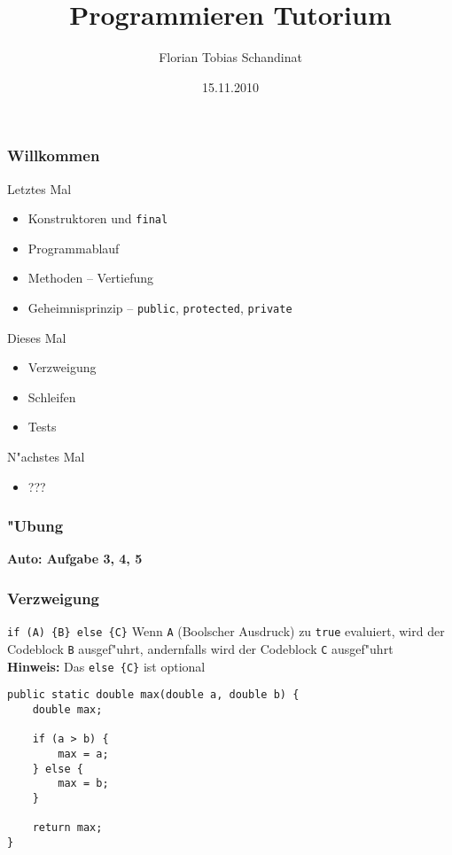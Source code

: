 \documentclass{beamer}
\title{Programmieren Tutorium}
\author{Florian Tobias Schandinat}
\date{15.11.2010}
\institute{FTS}
\begin{document}
\begin{frame}
\frametitle{Willkommen}
\pause
\begin{alertblock}{Letztes Mal}
\begin{itemize}
\item Konstruktoren und \texttt{final}
\item Programmablauf
\item Methoden -- Vertiefung
\item Geheimnisprinzip -- \texttt{public}, \texttt{protected}, \texttt{private}
\end{itemize}
\end{alertblock}

\pause

\begin{block}{Dieses Mal}
\begin{itemize}
\item Verzweigung
\item Schleifen
\item Tests
\end{itemize}
\end{block}

\pause

\begin{exampleblock}{N"achstes Mal}
\begin{itemize}
\item ???
\end{itemize}
\end{exampleblock}
\end{frame}


\begin{frame}
\frametitle{"Ubung}
\begin{center}
\textbf{\Huge Auto: Aufgabe 3, 4, 5}
\end{center}
\end{frame}


\begin{frame}[containsverbatim]
\frametitle{Verzweigung}
\begin{block}{\texttt{if (A) \{B\} else \{C\}}}
Wenn \texttt{A} (Boolscher Ausdruck) zu \texttt{true} evaluiert, wird der Codeblock \texttt{B} ausgef"uhrt, andernfalls wird der Codeblock \texttt{C} ausgef"uhrt\\
\textbf{Hinweis:} Das \texttt{else \{C\}} ist optional
\end{block}

\begin{lstlisting}
public static double max(double a, double b) {
	double max;

	if (a > b) {
		max = a;
	} else {
		max = b;
	}

	return max;
}
\end{lstlisting}
\end{frame}
\end{document}
